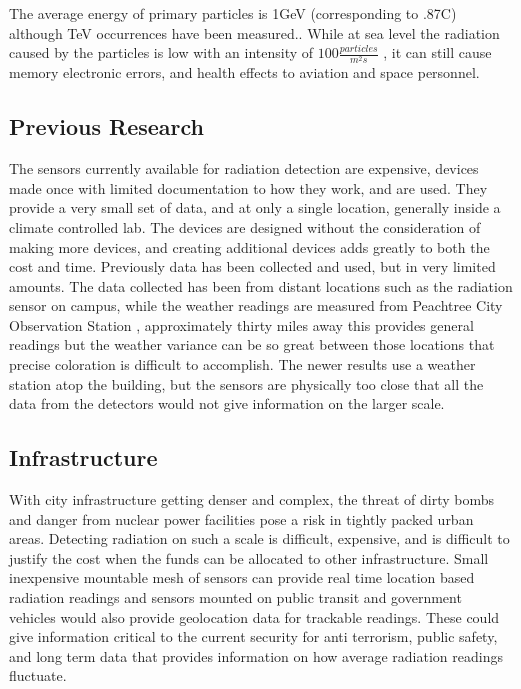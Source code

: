 \documentclass[10pt]{article}
\begin{document}
The average energy of primary particles is 1GeV (corresponding to .87C) 
although TeV occurrences have been measured.\cite{Nave}. While at sea level the 
radiation caused by the particles is low with an intensity of $100 \frac{particles}{m^2s}$ 
\cite{Mewaldt1996}, it can still cause memory electronic errors, and health effects to 
aviation \cite{Friedberg2000} and space personnel.

\subsection{Previous Research}
The sensors currently available for radiation detection are expensive, devices made 
once with limited documentation to how they work, and are used. They provide a very 
small set of data, and at only a single location, generally inside a climate controlled 
lab. The devices are designed without the consideration of making more devices, and 
creating additional devices adds greatly to both the cost and time. Previously data 
has been collected and used, but in very limited amounts. The data collected has been 
from distant locations such as the radiation sensor on campus, while the weather 
readings are measured from Peachtree City Observation Station \cite{Dayananda2013}, 
approximately thirty miles away this provides general readings but the weather variance 
can be so great between those locations that precise coloration is difficult to 
accomplish. The newer results use a weather station atop the building, but the sensors 
are physically too close that all the data from the detectors would not give 
information on the larger scale.

\subsection{Infrastructure}
With city infrastructure getting denser and complex, the threat of dirty bombs and 
danger from nuclear power facilities pose a risk in tightly packed urban areas. 
Detecting radiation on such a scale is difficult, expensive, and is difficult to 
justify the cost when the funds can be allocated to other infrastructure. Small 
inexpensive mountable mesh of sensors can provide real time location based
radiation readings and sensors mounted on public transit and government vehicles would also 
provide geolocation data for trackable readings. These could give information critical 
to the current security for anti terrorism, public safety, and long term data that provides information
on how average radiation readings fluctuate.
\end{document}
